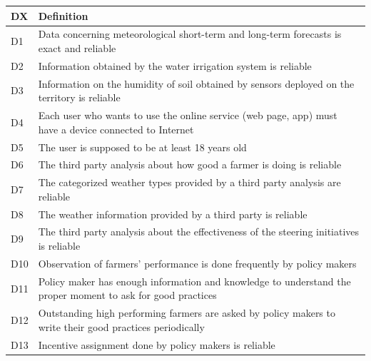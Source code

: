 \begin{table}[H]
    \setlength\arrayrulewidth{1pt}
    \centering
    \begin{tabular}{|l|m{}|}
        \rowcolor{myblue}
        \hline
        \color{white}DX & \color{white}Definition \\
        \hline
        \textsc{D1}  &    Data concerning meteorological short-term and long-term forecasts is exact and reliable \\
        \hline
        \textsc{D2}     &   Information obtained by the water irrigation system is reliable \\
        \hline
        \textsc{D3}  &    Information on the humidity of soil obtained by sensors deployed on the territory is reliable\\
        \hline
        \textsc{D4}  &    Each user who wants to use the online service (web page, app) must have a device connected to Internet\\
        \hline
        \textsc{D5}  &    The user is supposed to be at least 18 years old\\
        \hline
        \textsc{D6}  &    The third party analysis about how good a farmer is doing is reliable\\
        \hline
        \textsc{D7}  &    The categorized weather types provided by a third party analysis are reliable\\
        \hline
        \textsc{D8}  &     The weather information provided by a third party is reliable \\
        \textsc{D9}  &     The third party analysis about the effectiveness of the steering initiatives is reliable \\
        \hline
        
        \hline
        \hline
        \hline
        \textsc{D10}  &    Observation of  farmers' performance is done frequently by policy makers\\
        \hline
        \textsc{D11}  &    Policy maker has enough information and knowledge to understand the proper moment to ask for good practices\\
        \hline
        \textsc{D12}  &    Outstanding high performing farmers are asked by policy makers to write their good practices periodically\\
        \hline
        \textsc{D13}  &     Incentive assignment done by policy makers is reliable \\
        \hline
        

\end{tabular}
\end{table}
